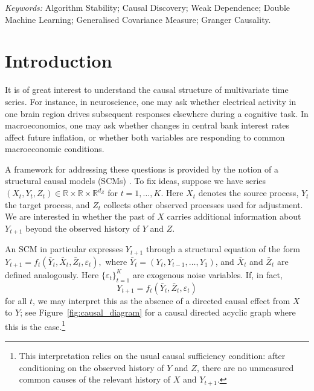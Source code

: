 \documentclass[12pt]{article}
\newcommand{\R}{\mathbb{R}}
\numberwithin{equation}{section}
\begin{document}
\noindent%
{\it Keywords:}  Algorithm Stability; Causal Discovery; Weak Dependence; Double Machine Learning; Generalised Covariance Measure; Granger Causality.
\vfill


\newpage
{}

\section{Introduction}



It is of great interest to understand the causal structure of multivariate time series. For instance, in neuroscience, one may ask whether electrical activity in one brain region drives subsequent responses elsewhere during a cognitive task. In macroeconomics, one may ask whether changes in central bank interest rates affect future inflation, or whether both variables are responding to common macroeconomic conditions.

A framework for addressing these questions is provided by the notion of a structural causal models (SCMs) \citep{peters2017elements}. To fix ideas, suppose we have series $(X_t, Y_t, Z_t) \in \R \times \R \times \R^{d_Z}$ for $t=1,\ldots,K$. Here \(X_t\) denotes the source process, \(Y_t\) the target process, and \(Z_t\) collects other observed processes used for adjustment. We are interested in whether the past of \(X\) carries additional information about \(Y_{t+1}\) beyond the observed history of \(Y\) and \(Z\).

\sloppy An SCM in particular expresses \(Y_{t+1}\) through a structural equation of the form $Y_{t+1}
=
f_t(\bar Y_t,\bar X_t,\bar Z_t,\varepsilon_t),$ where \(\bar Y_t=(Y_t,Y_{t-1},\ldots,Y_1)\), and \(\bar X_t\) and \(\bar Z_t\) are defined analogously. Here \(\{\varepsilon_t\}_{t=1}^K\) are exogenous noise variables. If, in fact,
\begin{equation}
\label{eq:SCM_CI}
Y_{t+1} = f_t(\bar Y_t,\bar Z_t,\varepsilon_t)
\end{equation}
for all \(t\),
we may %
interpret this as the absence of a directed causal effect from \(X\) to
\(Y\); see Figure~\ref{fig:causal_diagram} for a causal directed acyclic graph where this is the case.\footnote{This interpretation relies on the usual causal sufficiency condition: after conditioning on the observed history of \(Y\) and \(Z\), there are no unmeasured common causes of the relevant history of \(X\) and \(Y_{t+1}\).}
\end{document}
